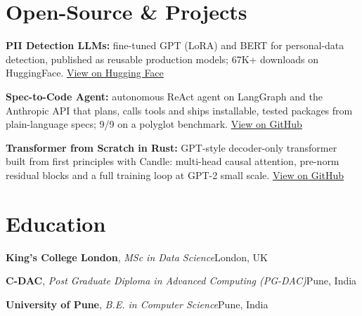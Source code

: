 \documentclass[10pt,a4paper]{article}
\begin{document}
\section{Open-Source \& Projects}
\begin{tight}
  \item \textbf{PII Detection LLMs:} fine-tuned GPT (LoRA) and BERT for personal-data detection, published as reusable production models; 67K+ downloads on HuggingFace. \href{https://huggingface.co/ab-ai/pii_model}{View on Hugging Face}
  \item \textbf{Spec-to-Code Agent:} autonomous ReAct agent on LangGraph and the Anthropic API that plans, calls tools and ships installable, tested packages from plain-language specs; 9/9 on a polyglot benchmark. \href{https://github.com/abhijeetscode/Spec-to-Code-Agent}{View on GitHub}
  \item \textbf{Transformer from Scratch in Rust:} GPT-style decoder-only transformer built from first principles with Candle: multi-head causal attention, pre-norm residual blocks and a full training loop at GPT-2 small scale. \href{https://github.com/abhijeetscode/transformer-rust}{View on GitHub}
\end{tight}

\section{Education}
{\color{company}\bfseries King's College London}, {\itshape MSc in Data Science}\hfill {\color{muted}London, UK}\par\vspace{2pt}
{\color{company}\bfseries C-DAC}, {\itshape Post Graduate Diploma in Advanced Computing (PG-DAC)}\hfill {\color{muted}Pune, India}\par\vspace{2pt}
{\color{company}\bfseries University of Pune}, {\itshape B.E. in Computer Science}\hfill {\color{muted}Pune, India}\par
\end{document}
